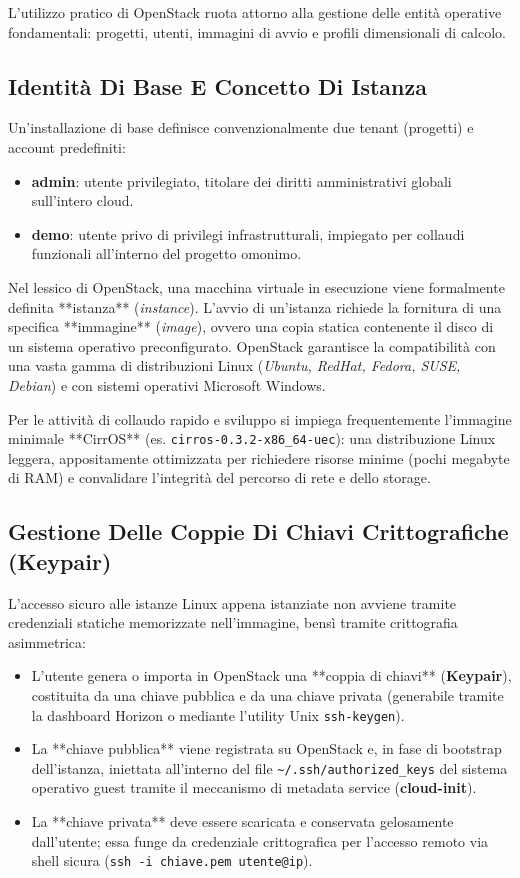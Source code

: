\documentclass[11pt, a4paper]{article}
\begin{document}
L'utilizzo pratico di OpenStack ruota attorno alla gestione delle entità operative fondamentali: progetti, utenti, immagini di avvio e profili dimensionali di calcolo.

\subsection{Identità Di Base E Concetto Di Istanza}

Un'installazione di base definisce convenzionalmente due tenant (progetti) e account predefiniti:
\begin{itemize}[noitemsep]
    \item \textbf{admin}: utente privilegiato, titolare dei diritti amministrativi globali sull'intero cloud.
    \item \textbf{demo}: utente privo di privilegi infrastrutturali, impiegato per collaudi funzionali all'interno del progetto omonimo.
\end{itemize}

Nel lessico di OpenStack, una macchina virtuale in esecuzione viene formalmente definita **istanza** (\emph{instance}). L'avvio di un'istanza richiede la fornitura di una specifica **immagine** (\emph{image}), ovvero una copia statica contenente il disco di un sistema operativo preconfigurato. OpenStack garantisce la compatibilità con una vasta gamma di distribuzioni Linux (\emph{Ubuntu, RedHat, Fedora, SUSE, Debian}) e con sistemi operativi Microsoft Windows.

Per le attività di collaudo rapido e sviluppo si impiega frequentemente l'immagine minimale **CirrOS** (es. \texttt{cirros-0.3.2-x86\_64-uec}): una distribuzione Linux leggera, appositamente ottimizzata per richiedere risorse minime (pochi megabyte di RAM) e convalidare l'integrità del percorso di rete e dello storage.

\subsection{Gestione Delle Coppie Di Chiavi Crittografiche (Keypair)}

L'accesso sicuro alle istanze Linux appena istanziate non avviene tramite credenziali statiche memorizzate nell'immagine, bensì tramite crittografia asimmetrica:
\begin{itemize}
    \item L'utente genera o importa in OpenStack una **coppia di chiavi** (\textbf{Keypair}), costituita da una chiave pubblica e da una chiave privata (generabile tramite la dashboard Horizon o mediante l'utility Unix \texttt{ssh-keygen}).
    \item La **chiave pubblica** viene registrata su OpenStack e, in fase di bootstrap dell'istanza, iniettata all'interno del file \texttt{\textasciitilde/.ssh/authorized\_keys} del sistema operativo guest tramite il meccanismo di metadata service (\textbf{cloud-init}).
    \item La **chiave privata** deve essere scaricata e conservata gelosamente dall'utente; essa funge da credenziale crittografica per l'accesso remoto via shell sicura (\texttt{ssh -i chiave.pem utente@ip}).
\end{itemize}
\end{document}
